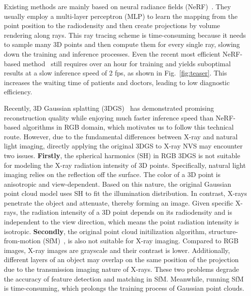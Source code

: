 \documentclass[runningheads]{llncs}
\begin{document}
Existing methods are mainly based on neural radiance fields (NeRF)~\cite{nerf}. They usually employ a multi-layer perceptron (MLP) to learn the mapping from the point position to the radiodensity and then create projections by volume rendering along rays. This ray tracing scheme is time-consuming because it needs to sample many 3D points and then compute them for every single ray, slowing down the training and inference processes. Even the recent most efficient NeRF-based method~\cite{naf} still requires over an hour for training and yields suboptimal results at a slow inference speed of 2 fps, as shown in Fig.~\ref{fig:teaser}. This increases the waiting time of patients and doctors, leading to low diagnostic efficiency.

Recently, 3D Gaussian splatting (3DGS)~\cite{3dgs} has demonstrated promising reconstruction quality while enjoying much faster inference speed than NeRF-based algorithms in RGB domain, which motivates us to follow this technical route. However, due to the fundamental differences between X-ray and natural light imaging, directly applying the original 3DGS to X-ray NVS may encounter two issues. \textbf{Firstly}, the spherical harmonics (SH) in RGB 3DGS is not suitable for modeling the X-ray radiation intensity of 3D points. Specifically, natural light imaging relies on the reflection off the surface. The color of a 3D point is anisotropic and view-dependent. Based on this nature, the original Gaussian point cloud model uses SH to fit the illumination distribution.  In contrast, X-rays penetrate the object and attenuate, thereby forming an image. Given specific X-rays, the radiation intensity of a 3D point depends on its radiodensity and is independent to the view direction, which means the point radiation intensity is isotropic. \textbf{Secondly}, the original point cloud initilization algorithm, structure-from-motion (SfM)~\cite{sfm}, is also not suitable for X-ray imaging. Compared to RGB images, X-ray images are grayscale and their contrast is lower. Additionally, different layers of an object may overlap on the same position of the projection due to the transmission imaging nature of X-rays. These two problems degrade the accuracy of feature detection and matching in SfM. Meanwhile, running SfM is time-consuming, which prolongs the training process of Gaussian point clouds.
\end{document}
